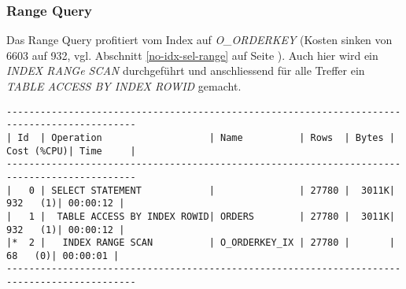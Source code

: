 \documentclass[11pt,a4paper,parskip=half]{scrartcl}
\begin{document}
\subsubsection{Range Query}
Das Range Query profitiert vom  Index auf \emph{O\_ORDERKEY} (Kosten sinken von 6603 auf 932, vgl. Abschnitt \ref{no-idx-sel-range} auf Seite \pageref{no-idx-sel-range}). Auch hier wird ein \emph{INDEX RANGe SCAN} durchgeführt und anschliessend für alle Treffer ein \emph{TABLE ACCESS BY INDEX ROWID} gemacht.\\ 
\begin{lstlisting}
---------------------------------------------------------------------------------------------                                                                                                                                                                                                                
| Id  | Operation                   | Name          | Rows  | Bytes | Cost (%CPU)| Time     |                                                                                                                                                                                                                
---------------------------------------------------------------------------------------------                                                                                                                                                                                                                
|   0 | SELECT STATEMENT            |               | 27780 |  3011K|   932   (1)| 00:00:12 |                                                                                                                                                                                                                
|   1 |  TABLE ACCESS BY INDEX ROWID| ORDERS        | 27780 |  3011K|   932   (1)| 00:00:12 |                                                                                                                                                                                                                
|*  2 |   INDEX RANGE SCAN          | O_ORDERKEY_IX | 27780 |       |    68   (0)| 00:00:01 |                                                                                                                                                                                                                
---------------------------------------------------------------------------------------------                                                                                                                                                                                                                
                                                                                                                                                                                                                                                                                                             

\end{lstlisting}
\end{document}
